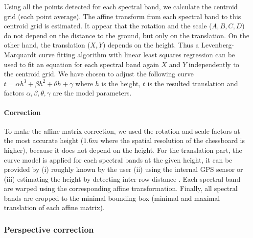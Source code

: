 \documentclass[]{elsarticle}
\begin{document}
	Using all the points detected for each spectral band, we calculate the centroid grid (each point average).
	The affine transform from each spectral band to this centroid grid is estimated.
	It appear that the rotation and the scale ($A,B,C,D$) do not depend on the distance to the ground, but only on the translation.
	On the other hand, the translation ($X,Y$) depends on the height.
	Thus a Levenberg-Marquardt curve fitting algorithm with linear least squares regression \cite{More78}
	can be used to fit an equation for each spectral band again $X$ and $Y$ independently to the centroid grid.
	We have chosen to adjust the following curve $t = \alpha h^3 + \beta h^2 + \theta h + \gamma$ where $h$ is the height,
	$t$ is the resulted translation and factors $\alpha,\beta,\theta,\gamma$ are the model parameters.
	
	\paragraph{Correction}
	
	To make the affine matrix correction, we used the rotation and scale factors at the most accurate height
	($1.6m$ where the spatial resolution of the chessboard is higher), because it does not depend on the height.
	For the translation part, the curve model is applied for each spectral bands at the given height,
	it can be provided by
		(i) roughly known by the user
		(ii) using the internal GPS sensor or
		(iii) estimating the height by detecting inter-row distance \cite{Bossu2007SegmentationDP}.
	Each spectral band are warped using the corresponding affine transformation.
	Finally, all spectral bands are cropped to the minimal bounding box (minimal and maximal translation of each affine matrix).
	
	\subsubsection{Perspective correction}
	
\end{document}

